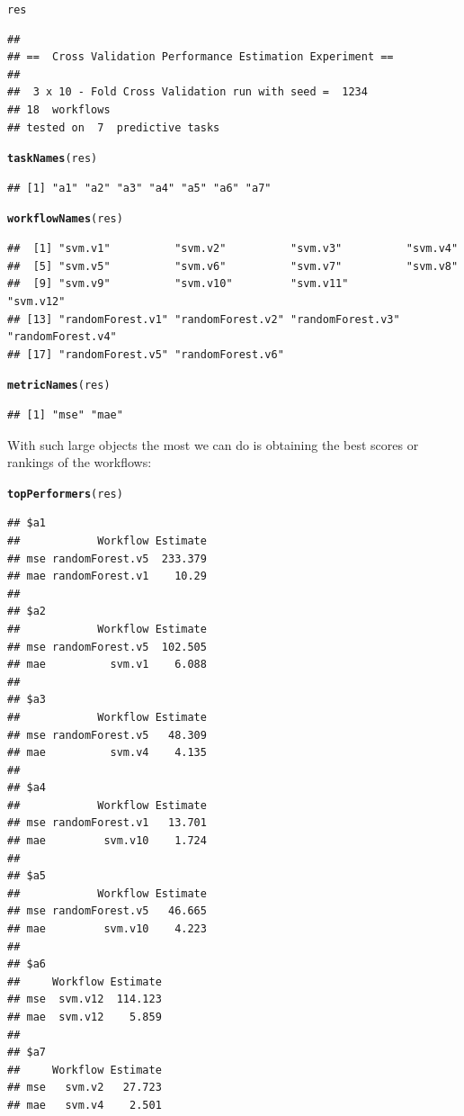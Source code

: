 \documentclass[10pt,a4paper]{article}\usepackage[]{graphicx}\usepackage[]{color}
\makeatletter
\newcommand{\hlstd}[1]{\textcolor[rgb]{0.345,0.345,0.345}{#1}}%
\newcommand{\hlkwd}[1]{\textcolor[rgb]{0.737,0.353,0.396}{\textbf{#1}}}%
\newenvironment{kframe}{%
 \def\at@end@of@kframe{}%
 \ifinner\ifhmode%
  \def\at@end@of@kframe{\end{minipage}}%
  \begin{minipage}{\columnwidth}%
 \fi\fi%
 \def\FrameCommand##1{\hskip\@totalleftmargin \hskip-\fboxsep
 \colorbox{shadecolor}{##1}\hskip-\fboxsep
     \hskip-\linewidth \hskip-\@totalleftmargin \hskip\columnwidth}%
 \MakeFramed {\advance\hsize-\width
   \@totalleftmargin\z@ \linewidth\hsize
   \@setminipage}}%
 {\par\unskip\endMakeFramed%
 \at@end@of@kframe}
\newenvironment{knitrout}{}{} %
\makeatother
\begin{document}
\begin{knitrout}\small
{}\color{fgcolor}\begin{kframe}
\begin{alltt}
\hlstd{res}
\end{alltt}
\begin{verbatim}
## 
## ==  Cross Validation Performance Estimation Experiment ==
## 
##  3 x 10 - Fold Cross Validation run with seed =  1234 
## 18  workflows
## tested on  7  predictive tasks
\end{verbatim}
\begin{alltt}
\hlkwd{taskNames}\hlstd{(res)}
\end{alltt}
\begin{verbatim}
## [1] "a1" "a2" "a3" "a4" "a5" "a6" "a7"
\end{verbatim}
\begin{alltt}
\hlkwd{workflowNames}\hlstd{(res)}
\end{alltt}
\begin{verbatim}
##  [1] "svm.v1"          "svm.v2"          "svm.v3"          "svm.v4"         
##  [5] "svm.v5"          "svm.v6"          "svm.v7"          "svm.v8"         
##  [9] "svm.v9"          "svm.v10"         "svm.v11"         "svm.v12"        
## [13] "randomForest.v1" "randomForest.v2" "randomForest.v3" "randomForest.v4"
## [17] "randomForest.v5" "randomForest.v6"
\end{verbatim}
\begin{alltt}
\hlkwd{metricNames}\hlstd{(res)}
\end{alltt}
\begin{verbatim}
## [1] "mse" "mae"
\end{verbatim}
\end{kframe}
\end{knitrout}


With such large objects the most we can do is obtaining the best
scores or rankings of the workflows:

\begin{knitrout}\small
{}\color{fgcolor}\begin{kframe}
\begin{alltt}
\hlkwd{topPerformers}\hlstd{(res)}
\end{alltt}
\begin{verbatim}
## $a1
##            Workflow Estimate
## mse randomForest.v5  233.379
## mae randomForest.v1    10.29
## 
## $a2
##            Workflow Estimate
## mse randomForest.v5  102.505
## mae          svm.v1    6.088
## 
## $a3
##            Workflow Estimate
## mse randomForest.v5   48.309
## mae          svm.v4    4.135
## 
## $a4
##            Workflow Estimate
## mse randomForest.v1   13.701
## mae         svm.v10    1.724
## 
## $a5
##            Workflow Estimate
## mse randomForest.v5   46.665
## mae         svm.v10    4.223
## 
## $a6
##     Workflow Estimate
## mse  svm.v12  114.123
## mae  svm.v12    5.859
## 
## $a7
##     Workflow Estimate
## mse   svm.v2   27.723
## mae   svm.v4    2.501
\end{verbatim}
\end{kframe}
\end{knitrout}
\end{document}
